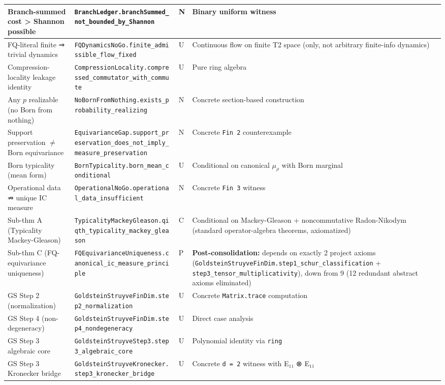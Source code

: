 \documentclass[11pt,a4paper]{article}
\begin{document}
\begin{center}
\begin{tabularx}{\linewidth}{|Y|Y|Y|Y|}
\hline
Branch-summed cost > Shannon possible & \texttt{BranchLedger.branchSummed\_not\_bounded\_by\_Shannon} & N & Binary uniform witness \\
\hline
FQ-literal finite ⇒ trivial dynamics & \texttt{FQDynamicsNoGo.finite\_admissible\_flow\_fixed} & U & Continuous flow on finite T2 space (only, not arbitrary finite-info dynamics) \\
\hline
Compression-locality leakage identity & \texttt{CompressionLocality.compressed\_commutator\_with\_commute} & U & Pure ring algebra \\
\hline
Any $p$ realizable (no Born from nothing) & \texttt{NoBornFromNothing.exists\_probability\_realizing} & N & Concrete section-based construction \\
\hline
Support preservation $\neq$ Born equivariance & \texttt{EquivarianceGap.support\_preservation\_does\_not\_imply\_measure\_preservation} & N & Concrete \texttt{Fin 2} counterexample \\
\hline
Born typicality (mean form) & \texttt{BornTypicality.born\_mean\_conditional} & U & Conditional on canonical $\mu_\rho$ with Born marginal \\
\hline
Operational data ⇏ unique IC measure & \texttt{OperationalNoGo.operational\_data\_insufficient} & N & Concrete \texttt{Fin 3} witness \\
\hline
Sub-thm A (Typicality Mackey-Gleason) & \texttt{TypicalityMackeyGleason.qiqth\_typicality\_mackey\_gleason} & C & Conditional on Mackey-Gleason + noncommutative Radon-Nikodym (standard operator-algebra theorems, axiomatized) \\
\hline
Sub-thm C (FQ-equivariance uniqueness) & \texttt{FQEquivarianceUniqueness.canonical\_ic\_measure\_principle} & P & \textbf{Post-consolidation:} depends on exactly 2 project axioms (\texttt{GoldsteinStruyveFinDim.step1\_schur\_classification} + \texttt{step3\_tensor\_multiplicativity}), down from 9 (12 redundant abstract axioms eliminated) \\
\hline
GS Step 2 (normalization) & \texttt{GoldsteinStruyveFinDim.step2\_normalization} & U & Concrete \texttt{Matrix.trace} computation \\
\hline
GS Step 4 (non-degeneracy) & \texttt{GoldsteinStruyveFinDim.step4\_nondegeneracy} & U & Direct case analysis \\
\hline
GS Step 3 algebraic core & \texttt{GoldsteinStruyveStep3.step3\_algebraic\_core} & U & Polynomial identity via \texttt{ring} \\
\hline
GS Step 3 Kronecker bridge & \texttt{GoldsteinStruyveKronecker.step3\_kronecker\_bridge} & U & Concrete \texttt{d = 2} witness with E₁₁ ⊗ E₁₁ \\

\end{tabularx}
\end{center}
\end{document}
